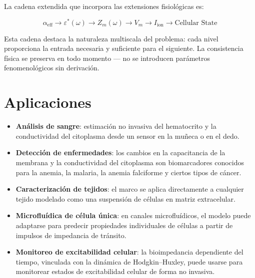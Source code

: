 \documentclass[12pt]{article}
\begin{document}
La cadena extendida que incorpora las extensiones fisiol\'ogicas es:

\begin{equation}
\alpha_{\text{eff}}
\rightarrow
\varepsilon^*(\omega)
\rightarrow
Z_m(\omega)
\rightarrow
V_m
\rightarrow
I_{\text{ion}}
\rightarrow
\text{Cellular State}
\end{equation}

Esta cadena destaca la naturaleza multiscala del problema: cada nivel proporciona la entrada
necesaria y suficiente para el siguiente. La consistencia f\'isica se preserva en todo momento
--- no se introducen par\'ametros fenomenol\'ogicos sin derivaci\'on.


\section{Aplicaciones}

\label{sec:aplicaciones}


\begin{itemize}
\item \textbf{An\'alisis de sangre}: estimaci\'on no invasiva del hematocrito y la
conductividad del citoplasma desde un sensor en la mu\~{n}eca o en el dedo.
\item \textbf{Detecci\'on de enfermedades}: los cambios en la capacitancia de la membrana
y la conductividad del citoplasma son biomarcadores conocidos para la anemia,
la malaria, la anemia falciforme y ciertos tipos de c\'ancer.
\item \textbf{Caracterizaci\'on de tejidos}: el marco se aplica directamente a cualquier
tejido modelado como una suspensi\'on de c\'elulas en matriz extracelular.
\item \textbf{Microflu\'idica de c\'elula \'unica}: en canales microflu\'idicos, el modelo puede
adaptarse para predecir propiedades individuales de c\'elulas a partir de impulsos
de impedancia de tr\'ansito.
\item \textbf{Monitoreo de excitabilidad celular}: la bioimpedancia dependiente del tiempo,
vinculada con la din\'amica de Hodgkin--Huxley, puede usarse para monitorear
estados de excitabilidad celular de forma no invasiva.
\end{itemize}

\end{document}
